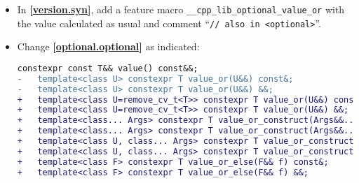\documentclass[11pt]{article}
\newcommand{\wgpaper}[1]{\href{https://wg21.link/#1}{#1}}
\newcommand{\isref}[1]{\textbf{[\wgpaper{#1}]}}
\begin{document}
\begin{itemize}
\item In \isref{version.syn}, add a feature macro
  \texttt{\_\_cpp\_lib\_optional\_value\_or} with the value calculated
  as usual and comment ``\texttt{// also in <optional>}''.
\item Change \isref{optional.optional} as indicated:
  \begin{lstlisting}[language=diff]
    constexpr const T&& value() const&&;
-   template<class U> constexpr T value_or(U&&) const&;
-   template<class U> constexpr T value_or(U&&) &&;
+   template<class U=remove_cv_t<T>> constexpr T value_or(U&&) const&;
+   template<class U=remove_cv_t<T>> constexpr T value_or(U&&) &&;
+   template<class... Args> constexpr T value_or_construct(Args&&... args) const&;
+   template<class... Args> constexpr T value_or_construct(Args&&... args) &&;
+   template<class U, class... Args> constexpr T value_or_construct(initializer_list<U> il, Args&&... args) const&;
+   template<class U, class... Args> constexpr T value_or_construct(initializer_list<U> il, Args&&... args) &&;
+   template<class F> constexpr T value_or_else(F&& f) const&;
+   template<class F> constexpr T value_or_else(F&& f) &&;


\end{lstlisting}
\end{itemize}
\end{document}
